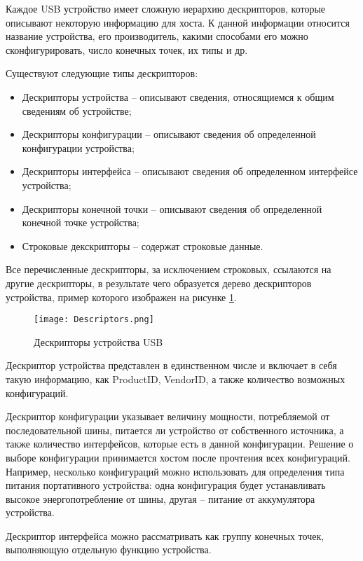 Каждое USB устройство имеет сложную иерархию дескрипторов, которые описывают
некоторую информацию для хоста. К данной информации относится название устройства,
его производитель, какими способами его можно
сконфигурировать, число конечных точек, их типы и др.

Существуют следующие типы дескрипторов:
\begin{itemize}
    \item Дескрипторы устройства -- описывают сведения, относящиемся
          к общим сведениям об устройстве;  
    \item Дескрипторы конфигурации -- описывают сведения об определенной 
          конфигурации устройства;
    \item Дескрипторы интерфейса -- описывают сведения об определенном
          интерфейсе устройства;
    \item Дескрипторы конечной точки -- описывают сведения об определенной
          конечной точке устройства;
    \item Строковые декскрипторы -- содержат строковые данные.
\end{itemize}

Все перечисленные дескрипторы, за исключением строковых, ссылаются на другие
дескрипторы, в результате чего образуется дерево дескрипторов устройства,
пример которого изображен на рисунке \ref{descriptors}.

\begin{figure}[H]
    \centering
    \texttt{[image: Descriptors.png]}
    \caption{Дескрипторы устройства USB}
    \label{descriptors}
\end{figure}

Дескриптор устройства представлен в единственном числе и включает в себя
такую информацию, как ProductID, VendorID, а также количество возможных конфигураций.

Дескриптор конфигурации указывает величину мощности, потребляемой
от последовательной шины, питается ли устройство от собственного источника,
а также количество интерфейсов, которые есть в данной конфигурации. 
Решение о выборе конфигурации принимается хостом после прочтения всех конфигураций.
%
Например, несколько конфигураций можно использовать для определения
типа питания портативного устройства: одна конфигурация будет устанавливать
высокое энергопотребление от шины, другая -- питание от аккумулятора устройства.

Дескриптор интерфейса можно рассматривать как группу конечных точек, 
выполняющую отдельную функцию устройства.

